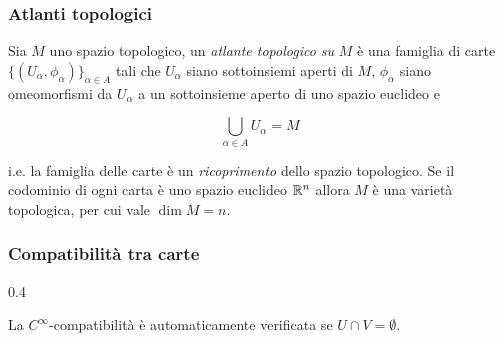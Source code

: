 \subsubsection{Atlanti topologici}

Sia $ M $ uno spazio topologico, un \textit{atlante topologico su} $ M $ è una famiglia di carte $ \{(U_{\alpha},\phi_{\alpha})\}_{\alpha \in A} $ tali che $ U_{\alpha} $ siano sottoinsiemi aperti di $ M $, $ \phi_{\alpha} $ siano omeomorfismi da $ U_{\alpha} $ a un sottoinsieme aperto di uno spazio euclideo e

\begin{equation}
	\bigcup_{\alpha \in A} U_{\alpha} = M
\end{equation}

i.e. la famiglia delle carte è un \textit{ricoprimento} dello spazio topologico. Se il codominio di ogni carta è uno spazio euclideo $ \mathbb{R}^{n} $ allora $ M $ è una varietà topologica, per cui vale $ \dim M = n $.

\subsubsection{Compatibilità tra carte}

	{0.4}{%
		}
	

\begin{remark}
	La $ C^{\infty} $-compatibilità è automaticamente verificata se $ U \cap V = \emptyset $.
\end{remark}

